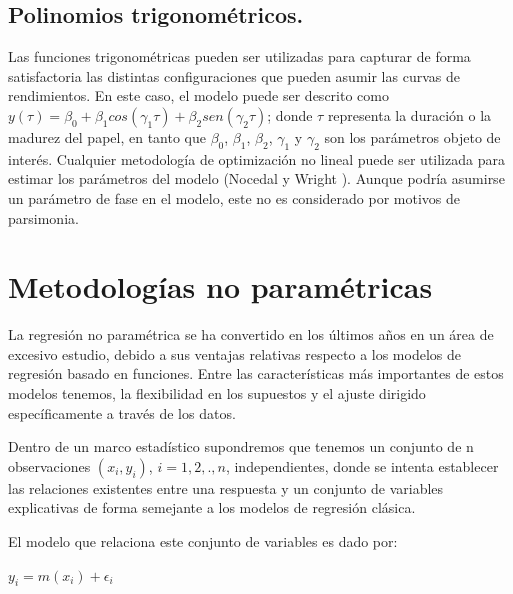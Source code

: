 \subsection{Polinomios trigonom\'etricos.\\}



\hspace*{0.4 cm} Las funciones trigonom\'etricas pueden ser utilizadas para capturar de
forma satisfactoria las distintas configuraciones que pueden asumir las
curvas de rendimientos. En este caso, el modelo puede ser descrito como
$y(\tau) = \beta_{0} + \beta_{1}cos(\gamma_{1}\tau) + \beta_{2}sen(\gamma_{2}\tau)$; donde $\tau$ representa la duraci\'on o la
madurez del papel, en tanto que $\beta_{0}$, $\beta_{1}$, $\beta_{2}$, $\gamma_{1}$ y $\gamma_{2}$ son los par\'ametros
objeto de inter\'es. Cualquier metodolog\'ia de optimizaci\'on no lineal puede
ser utilizada para estimar los par\'ametros del modelo (Nocedal y Wright
\cite{NW}). Aunque podr\'ia asumirse un par\'ametro de fase en el modelo, este
no es considerado por motivos de parsimonia.

\section{Metodolog\'ias no param\'etricas}

\hspace*{0.4 cm} La regresi\'on no param\'etrica se ha convertido en los \'ultimos a\~nos en un
\'area de excesivo estudio, debido a sus ventajas relativas respecto a los
modelos de regresi\'on basado en funciones. Entre las caracter\'isticas m\'as
importantes de estos modelos tenemos, la flexibilidad en los supuestos y
el ajuste dirigido espec\'ificamente a trav\'es de los datos.


\hspace*{0.4 cm} Dentro de un marco estad\'istico supondremos que tenemos un conjunto
de n observaciones $(x_{i}, y_{i})$, $i= 1, 2,., n$, independientes, donde se intenta
establecer las relaciones existentes entre una respuesta y un conjunto de
variables explicativas de forma semejante a los modelos de regresi\'on
cl\'asica.


\hspace*{0.4 cm} El modelo que relaciona este conjunto de variables es dado por:

\begin{center}
$\displaystyle{y_{i} = m(x_{i}) + \epsilon_{i}}$
\end{center} 



